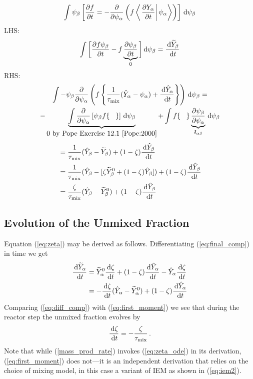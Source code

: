 \begin{align}
\int \psi_\beta \left[ \frac{\partial f}{\partial t} = - \frac{\partial}{\partial \psi_\alpha} \left( f \left\langle \left. \frac{\partial Y_\alpha}{\partial t} \right| \psi_\alpha \right\rangle \right) \right] \,\mathrm{d} \psi_\beta
\end{align}
LHS:
\begin{align}
\int \bigg[ \frac{\partial f \psi_\beta}{\partial t} - f \underbrace{\frac{\partial \psi_\beta}{\partial t}}_{0} \bigg] \,\mathrm{d} \psi_\beta = \frac{\,\mathrm{d} \widetilde{Y}_\beta}{\,\mathrm{d} t}
\end{align}
RHS:
\begin{multline}
\int - \psi_\beta \frac{\partial}{\partial \psi_\alpha} \left( f \left\{ \frac{1}{\tau_{\rm mix}}(\hat{Y}_\alpha - \psi_\alpha) + \frac{\,\mathrm{d} \hat{Y}_\alpha}{\,\mathrm{d} t} \right\} \right) \,\mathrm{d} \psi_\beta =\\ - \underbrace{\int \frac{\partial}{\partial \psi_\alpha}\left[ \psi_\beta f \{ \;\;\; \} \right] \,\mathrm{d} \psi_\beta}_{\mbox{0 by Pope Exercise 12.1 \cite{Pope:2000}}} + \int f \{\;\;\;\} \underbrace{\frac{\partial \psi_\beta}{\partial \psi_\alpha}}_{\delta_{\alpha \beta}} \,\mathrm{d} \psi_\beta
\end{multline}
\begin{align}
&= \frac{1}{\tau_{\rm mix}}(\hat{Y}_\beta - \widetilde{Y}_\beta) + (1-\zeta) \frac{\,\mathrm{d} \hat{Y}_\beta}{\,\mathrm{d} t} \notag\\
&= \frac{1}{\tau_{\rm mix}}(\hat{Y}_\beta - [\zeta \widetilde{Y}_\beta^0 + (1-\zeta)\hat{Y}_\beta]) + (1-\zeta) \frac{\,\mathrm{d} \hat{Y}_\beta}{\,\mathrm{d} t} \notag\\
&= \frac{\zeta}{\tau_{\rm mix}}(\hat{Y}_\beta - \widetilde{Y}_\beta^0) + (1-\zeta) \frac{\,\mathrm{d} \hat{Y}_\beta}{\,\mathrm{d} t} \label{eq:first_moment}
\end{align}

\subsection*{Evolution of the Unmixed Fraction}
\label{app:evo_unmixed}

Equation (\ref{eq:zeta}) may be derived as follows.  Differentiating (\ref{eq:final_comp}) in time we get
\begin{align}
\label{eq:diff_comp}
\frac{\,\mathrm{d} \widetilde{Y}_\alpha}{\,\mathrm{d} t}
&= \widetilde{Y}_\alpha^0 \frac{\,\mathrm{d} \zeta}{\,\mathrm{d} t} + (1-\zeta) \frac{\,\mathrm{d} \hat{Y}_\alpha}{\,\mathrm{d} t} - \hat{Y}_\alpha \frac{\,\mathrm{d} \zeta}{\,\mathrm{d} t} \notag\\
&= - \frac{\,\mathrm{d} \zeta}{\,\mathrm{d} t} (\hat{Y}_\alpha-\widetilde{Y}_\alpha^0) + (1-\zeta) \frac{\,\mathrm{d} \hat{Y}_\alpha}{\,\mathrm{d} t}
\end{align}
Comparing (\ref{eq:diff_comp}) with (\ref{eq:first_moment}) we see that during the reactor step the unmixed fraction evolves by
\begin{equation}
\label{eq:zeta_ode}
\frac{\,\mathrm{d} \zeta}{\,\mathrm{d} t} = - \frac{\zeta}{\tau_{\rm mix}} \,\mbox{.}
\end{equation}
Note that while (\ref{mass_prod_rate}) invokes (\ref{eq:zeta_ode}) in its derivation, (\ref{eq:first_moment}) does not---it is an independent derivation that relies on the choice of mixing model, in this case a variant of IEM as shown in (\ref{eq:iem2}).



